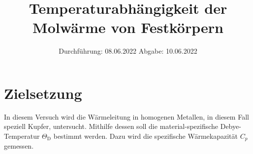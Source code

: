 

\subject{V47}
\title{Temperaturabhängigkeit der Molwärme von Festkörpern}
\date{
    Durchführung: 08.06.2022
     \hspace{3em}
    Abgabe: 10.06.2022
}


\maketitle
\thispagestyle{empty}
\tableofcontents
\newpage

\section{Zielsetzung}

    In diesem Versuch wird die Wärmeleitung in homogenen Metallen,
    in diesem Fall speziell Kupfer,
    untersucht.
    Mithilfe dessen soll die material-spezifische Debye-Temperatur $\Theta_\text{D}$ bestimmt werden.
    Dazu wird die spezifische Wärmekapazität $C_p$ gemessen.


\clearpage


\clearpage


\clearpage


\clearpage

\printbibliography



